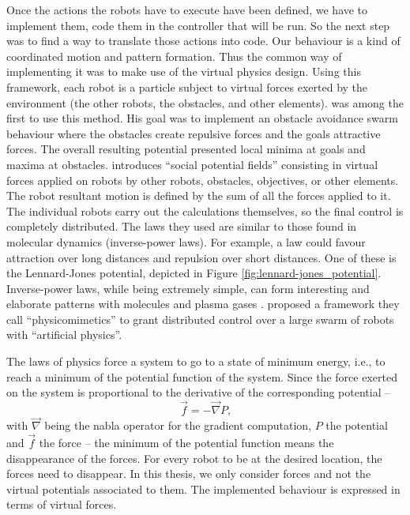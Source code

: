 \documentclass[oneside, a4paper, 12pt]{memoir}
\begin{document}
	Once the actions the robots have to execute have been defined, we have to implement them, code them in the controller that will be run. So the next step was to find a way to translate those actions into code. Our behaviour is a kind of coordinated motion and pattern formation. Thus the common way of implementing it was to make use of the virtual physics design. Using this framework, each robot is a particle subject to virtual forces exerted by the environment (the other robots, the obstacles, and other elements). \citet{khatib1986real} was among the first to use this method. His goal was to implement an obstacle avoidance swarm behaviour where the obstacles create repulsive forces and the goals attractive forces. The overall resulting potential presented local minima at goals and maxima at obstacles. \citet{reif1999social} introduces \enquote{social potential fields} consisting in virtual forces applied on robots by other robots, obstacles, objectives, or other elements. The robot resultant motion is defined by the sum of all the forces applied to it. The individual robots carry out the calculations themselves, so the final control is completely distributed. The laws they used are similar to those found in molecular dynamics (inverse-power laws). For example, a law could favour attraction over long distances and repulsion over short distances. One of these is the Lennard-Jones potential, depicted in Figure \ref{fig:lennard-jones_potential}. Inverse-power laws, while being extremely simple, can form interesting and elaborate patterns with molecules and plasma gases \citep{reif1999social}. \citet{spears2004distributed} proposed a framework they call \enquote{physicomimetics} to grant distributed control over a large swarm of robots with \enquote{artificial physics}.%
	
	The laws of physics force a system to go to a state of minimum energy, i.e., to reach a minimum of the potential function of the system. Since the force exerted on the system is proportional to the derivative of the corresponding potential -- $$\vec{f} = -\vec{\nabla}P\mbox{,}$$ with $\vec{\nabla}$ being the nabla operator for the gradient computation, $P$ the potential and $\vec{f}$ the force -- the minimum of the potential function means the disappearance of the forces. For every robot to be at the desired location, the forces need to disappear. In this thesis, we only consider forces and not the virtual potentials associated to them. The implemented behaviour is expressed in terms of virtual forces.
	
\end{document}
